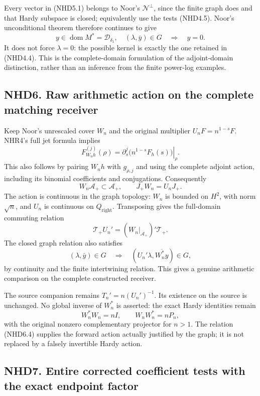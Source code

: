 Every vector in (NHD5.1) belongs to Noor's \(\mathcal N^\perp\), since
the finite graph does and that Hardy subspace is closed; equivalently
use the tests (NHD4.5). Noor's unconditional theorem therefore continues
to give \[
y\in\operatorname{dom}M^*=\mathcal D_{\delta_1},\quad
(\lambda,\bar y)\in G
\quad\Longrightarrow\quad y=0.
\tag{NHD5.5}
\] It does not force \(\lambda=0\): the possible kernel is exactly the
one retained in (NHD4.4). This is the complete-domain formulation of the
adjoint-domain distinction, rather than an inference from the finite
power-log examples.

\subsection{NHD6. Raw arithmetic action on the complete matching
receiver}\label{nhd6.-raw-arithmetic-action-on-the-complete-matching-receiver}

Keep Noor's unrescaled cover \(W_n\) and the original multiplier
\(U_nF=n^{1-s}F\). NHR4's full jet formula implies \[
F_{W_nh}^{(j)}(\rho)
=\left.\partial_s^j\bigl(n^{1-s}F_h(s)\bigr)\right|_{\rho}.
\tag{NHD6.1}
\] This also follows by pairing \(W_nh\) with \(g_{\rho,j}\) and using
the complete adjoint action, including its binomial coefficients and
conjugations. Consequently \[
W_n\mathscr A_+\subset\mathscr A_+,
\qquad J_+W_n=U_nJ_+.
\tag{NHD6.2}
\] The action is continuous in the graph topology: \(W_n\) is bounded on
\(H^2\), with norm \(\sqrt n\), and \(U_n\) is continuous on
\(Q_{\mathrm{right}}\). Transposing gives the full-domain commuting
relation \[
\boxed{\mathcal T_+U_n'=(W_n|_{\mathscr A_+})'\mathcal T_+.}
\tag{NHD6.3}
\] The closed graph relation also satisfies \[
(\lambda,\bar y)\in G
\quad\Longrightarrow\quad
(U_n'\lambda,\overline{W_n^*y})\in G,
\tag{NHD6.4}
\] by continuity and the finite intertwining relation. This gives a
genuine arithmetic comparison on the complete constructed receiver.

The source companion remains \(T_n'=n(U_n')^{-1}\). Its existence on the
source is unchanged. No global inverse of \(W_n^*\) is asserted: the
exact Hardy identities remain \[
W_n^*W_n=nI,\qquad W_nW_n^*=nP_n,
\tag{NHD6.5}
\] with the original nonzero complementary projector for \(n>1\). The
relation (NHD6.4) supplies the forward action actually justified by the
graph; it is not replaced by a falsely invertible Hardy action.

\subsection{NHD7. Entire corrected coefficient tests with the exact
endpoint
factor}\label{nhd7.-entire-corrected-coefficient-tests-with-the-exact-endpoint-factor}

